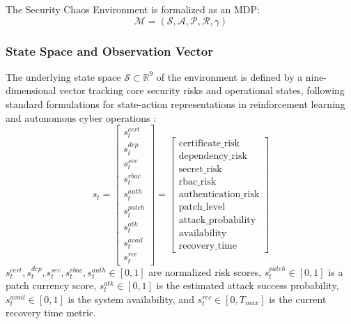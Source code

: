 \documentclass[conference,10pt]{IEEEtran}
\begin{document}
The Security Chaos Environment is formalized as an MDP:
\begin{equation}
	\mathcal{M} = (\mathcal{S}, \mathcal{A}, \mathcal{P}, \mathcal{R}, \gamma)
\end{equation}

\subsubsection{State Space and Observation Vector}

The underlying state space $\mathcal{S} \subset \mathbb{R}^9$ of the environment is defined by a nine-dimensional vector tracking core security risks and operational states, following standard formulations for state-action representations in reinforcement learning \cite{silver2016mastering, mnih2015human} and autonomous cyber operations \cite{standen2021cyborg}: 
\begin{equation}
	s_t = \begin{bmatrix}
		s_t^{cert} \\
		s_t^{dep} \\
		s_t^{sec} \\
		s_t^{rbac} \\
		s_t^{auth} \\
		s_t^{patch} \\
		s_t^{atk} \\
		s_t^{avail} \\
		s_t^{rec}
	\end{bmatrix}
	= \begin{bmatrix}
		\text{certificate\_risk} \\
		\text{dependency\_risk} \\
		\text{secret\_risk} \\
		\text{rbac\_risk} \\
		\text{authentication\_risk} \\
		\text{patch\_level} \\
		\text{attack\_probability} \\
		\text{availability} \\
		\text{recovery\_time}
	\end{bmatrix}
\end{equation}
$s_t^{cert}, s_t^{dep}, s_t^{sec}, s_t^{rbac}, s_t^{auth} \in [0, 1]$ are normalized risk scores, $s_t^{patch} \in [0, 1]$ is a patch currency score, $s_t^{atk} \in [0, 1]$ is the estimated attack success probability, $s_t^{avail} \in [0, 1]$ is the system availability, and $s_t^{rec} \in [0, T_{max}]$ is the current recovery time metric. 
\end{document}
